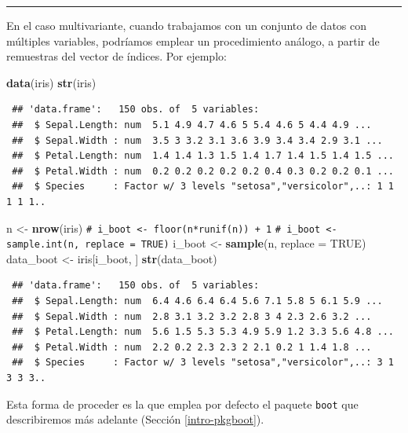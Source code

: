\documentclass[
  spanish,
  10pt,
]{book}
\newenvironment{Shaded}{\begin{snugshade}}{\end{snugshade}}
\newcommand{\AttributeTok}[1]{\textcolor[rgb]{0.13,0.29,0.53}{#1}}
\newcommand{\CommentTok}[1]{\textcolor[rgb]{0.56,0.35,0.01}{\textit{#1}}}
\newcommand{\ConstantTok}[1]{\textcolor[rgb]{0.56,0.35,0.01}{#1}}
\newcommand{\FunctionTok}[1]{\textcolor[rgb]{0.13,0.29,0.53}{\textbf{#1}}}
\newcommand{\NormalTok}[1]{#1}
\newcommand{\OtherTok}[1]{\textcolor[rgb]{0.56,0.35,0.01}{#1}}
\theoremstyle{break}
\theoremstyle{nonumberplain}
\renewcommand{\CommentTok}[1]{\textcolor[rgb]{0.41,0.41,0.41}{\texttt{#1}}}
\begin{document}
\begin{center}\rule{0.5\linewidth}{0.5pt}\end{center}

En el caso multivariante, cuando trabajamos con un conjunto de datos con múltiples variables, podríamos emplear un procedimiento análogo, a partir de remuestras del vector de índices.
Por ejemplo:

\begin{Shaded}
\begin{Highlighting}[]
\FunctionTok{data}\NormalTok{(iris)}
\FunctionTok{str}\NormalTok{(iris)}
\end{Highlighting}
\end{Shaded}

\begin{verbatim}
 ## 'data.frame':   150 obs. of  5 variables:
 ##  $ Sepal.Length: num  5.1 4.9 4.7 4.6 5 5.4 4.6 5 4.4 4.9 ...
 ##  $ Sepal.Width : num  3.5 3 3.2 3.1 3.6 3.9 3.4 3.4 2.9 3.1 ...
 ##  $ Petal.Length: num  1.4 1.4 1.3 1.5 1.4 1.7 1.4 1.5 1.4 1.5 ...
 ##  $ Petal.Width : num  0.2 0.2 0.2 0.2 0.2 0.4 0.3 0.2 0.2 0.1 ...
 ##  $ Species     : Factor w/ 3 levels "setosa","versicolor",..: 1 1 1 1 1..
\end{verbatim}

\begin{Shaded}
\begin{Highlighting}[]
\NormalTok{n }\OtherTok{\textless{}{-}} \FunctionTok{nrow}\NormalTok{(iris)}
\CommentTok{\# i\_boot \textless{}{-} floor(n*runif(n)) + 1}
\CommentTok{\# i\_boot \textless{}{-} sample.int(n, replace = TRUE)}
\NormalTok{i\_boot }\OtherTok{\textless{}{-}} \FunctionTok{sample}\NormalTok{(n, }\AttributeTok{replace =} \ConstantTok{TRUE}\NormalTok{)}
\NormalTok{data\_boot }\OtherTok{\textless{}{-}}\NormalTok{ iris[i\_boot, ]}
\FunctionTok{str}\NormalTok{(data\_boot)}
\end{Highlighting}
\end{Shaded}

\begin{verbatim}
 ## 'data.frame':   150 obs. of  5 variables:
 ##  $ Sepal.Length: num  6.4 4.6 6.4 6.4 5.6 7.1 5.8 5 6.1 5.9 ...
 ##  $ Sepal.Width : num  2.8 3.1 3.2 3.2 2.8 3 4 2.3 2.6 3.2 ...
 ##  $ Petal.Length: num  5.6 1.5 5.3 5.3 4.9 5.9 1.2 3.3 5.6 4.8 ...
 ##  $ Petal.Width : num  2.2 0.2 2.3 2.3 2 2.1 0.2 1 1.4 1.8 ...
 ##  $ Species     : Factor w/ 3 levels "setosa","versicolor",..: 3 1 3 3 3..
\end{verbatim}

Esta forma de proceder es la que emplea por defecto el paquete \texttt{boot} que describiremos más adelante (Sección \ref{intro-pkgboot}).
\end{document}
